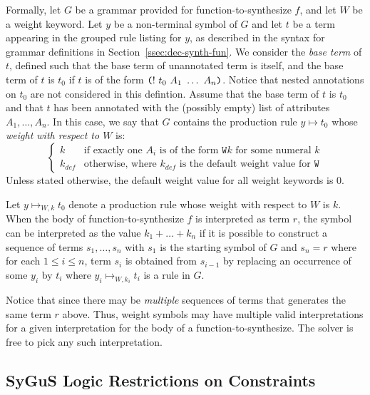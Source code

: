 \documentclass[english,a4paper,10pt]{article}
\begin{document}
Formally,
let $G$ be a grammar provided for function-to-synthesize $f$, and let $W$ be a weight keyword.
Let $y$ be a non-terminal symbol of $G$ and let $t$ be a term appearing
in the grouped rule listing for $y$, as described in the syntax for grammar
definitions in Section~\ref{ssec:dec-synth-fun}.
We consider the \emph{base term} of $t$, defined such that
the base term of unannotated term is itself, and
the base term of $t$ is $t_0$ if $t$ is of the form 
$\texttt{(}!\mbox{ }t_0\mbox{ }A_1\mbox{ }\ldots\mbox{ }A_n\texttt{)}$.
Notice that nested annotations on $t_0$ are not considered in this defintion.
Assume that the base term of $t$ is $t_0$ and that
$t$ has been annotated with the (possibly empty) list of attributes $A_1, \ldots, A_n$.
In this case, we say that $G$ contains
the production rule $y \mapsto t_0$ whose \emph{weight with respect to $W$} is:
\[
\begin{cases}
k & \text{if exactly one } A_i \text{ is of the form } \texttt{W} k \text{ for some numeral } k \\
k_{def} & \text{otherwise, where } k_{def} \text{ is the default weight value for } \texttt{W}
\end{cases}
\]
Unless stated otherwise, the default weight value for all weight keywords is $0$.

Let $y \mapsto_{W,k} t_0$ denote a production rule
whose weight with respect to $W$ is $k$.
When the body of function-to-synthesize $f$ is interpreted as term $r$,
the symbol  can be interpreted as the value 
$k_1 + \ldots + k_n$ if it is possible to construct a sequence of terms
$s_1, \ldots, s_n$
with $s_1$ is the starting symbol of $G$ and $s_n = r$
where for each $1 \leq i \leq n$, term $s_i$ is obtained from $s_{i-1}$ by
replacing an occurrence of some $y_i$ by $t_i$
where $y_i \mapsto_{W,k_i} t_i$ is a rule in $G$.

Notice that since there may be \emph{multiple} sequences of terms that
generates the same term $r$ above.
Thus, weight symbols may have multiple valid
interpretations for a given interpretation for the body of a function-to-synthesize.
The solver is free to pick any such interpretation.

\subsection{SyGuS Logic Restrictions on Constraints}
\label{ssec:logicr-constraints}

\end{document}
